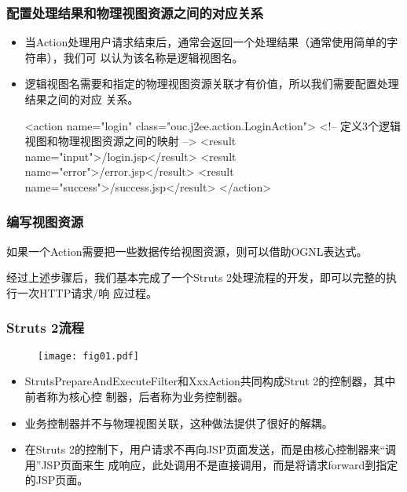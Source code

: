 \begin{frame}[fragile] %
\frametitle{ 配置处理结果和物理视图资源之间的对应关系}
\begin{itemize}
\item 当Action处理用户请求结束后，通常会返回一个处理结果（通常使用简单的字符串），我们可
  以认为该名称是{\hei 逻辑视图名}。
\item 逻辑视图名需要和指定的物理视图资源关联才有价值，所以我们需要配置处理结果之间的对应
  关系。
\begin{xmlCode}
<action name="login" class="ouc.j2ee.action.LoginAction">
  <!-- 定义3个逻辑视图和物理视图资源之间的映射 -->
  <result name="input">/login.jsp</result>
  <result name="error">/error.jsp</result>
  <result name="success">/success.jsp</result>
</action>  
\end{xmlCode}
\end{itemize}
\end{frame}

\begin{frame}[fragile] %
\frametitle{ 编写视图资源}

如果一个Action需要把一些数据传给视图资源，则可以借助{\Red\hei OGNL表达式}。

经过上述步骤后，我们基本完成了一个Struts 2处理流程的开发，即可以完整的执行一次HTTP请求/响
应过程。
\end{frame}

\begin{frame}[fragile] %
\frametitle{Struts 2流程}
\begin{figure}
\centering
\texttt{[image: fig01.pdf]}
\end{figure}
\begin{itemize}\small\kai
\item StrutsPrepareAndExecuteFilter和XxxAction共同构成Strut 2的控制器，其中前者称为核心控
  制器，后者称为业务控制器。
\item 业务控制器并不与物理视图关联，这种做法提供了很好的解耦。
\item 在Struts 2的控制下，用户请求不再向JSP页面发送，而是由核心控制器来“调用”JSP页面来生
  成响应，此处调用不是直接调用，而是将请求forward到指定的JSP页面。
\end{itemize}

\end{frame}





